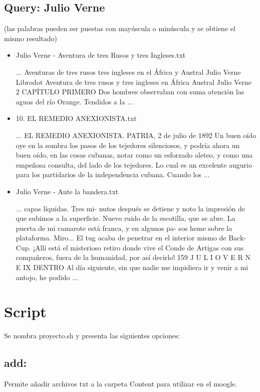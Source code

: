 \documentclass[a4paper,12pt,]{article}
\begin{document}
\subsection*{Query: Julio Verne}
(las palabras pueden ser puestas con mayúscula o minúscula y se obtiene el mismo resultado)
\begin{itemize}
    \item Julio Verne - Aventura de tres Rusos y tres Ingleses.txt
    
    ... Aventuras de tres rusos tres ingleses en el África y Austral Julio Verne Librodot Aventura de tres rusos 
    y tres ingleses en África Austral Julio Verne 2 CAPÍTULO PRIMERO Dos hombres observaban con suma atención las 
    aguas del río Orange. Tendidos a la ...

    \item 10. EL REMEDIO ANEXIONISTA.txt
    
    ... EL REMEDIO ANEXIONISTA. PATRIA, 2 de julio de 1892 Un buen oído oye en la sombra los pasos de los 
    tejedores silenciosos, y podría ahora un buen oído, en las cosas cubanas, notar como un esforzado aleteo, 
    y como una empeñosa consulta, del lado de los tejedores. Lo cual es un excelente augurio para los partidarios 
    de la independencia cubana. Cuando los ...

    \item Julio Verne - Ante la bandera.txt 
    
    ... capas líquidas. Tres mi- nutos después se detiene y noto la impresión de que subimos a la superficie. Nuevo 
    ruido de la escotilla, que se abre. La puerta de mi camarote está franca, y en algunos pa- sos heme sobre la 
    plataforma. Miro... El tug acaba de penetrar en el interior mismo de Back-Cup. ¡Allí está el misterioso retiro 
    donde vive el Conde de Artigas con sus compañeros, fuera de la humanidad, por así decirlo! 159 J U L I O V E R 
    N E IX DENTRO Al día siguiente, sin que nadie me impidiera ir y venir a mi antojo, he podido ...
\end{itemize}

\section*{Script}
Se nombra proyecto.sh y presenta las siguientes opciones:

\subsection*{add: }
Permite añadir archivos txt a la carpeta Content para utilizar en el moogle.
\end{document}
